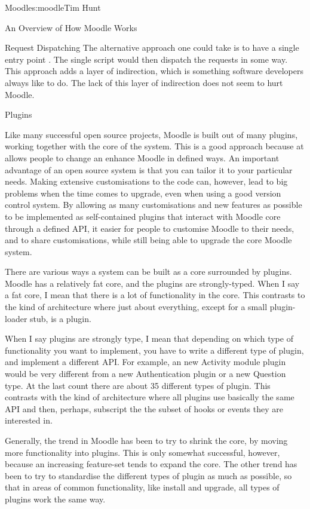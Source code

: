 \begin{aosachapter}{Moodle}{s:moodle}{Tim Hunt}
\begin{aosasect1}{An Overview of How Moodle Works}
\begin{aosasect2}{Request Dispatching}
The alternative approach one could take is to have a single entry
point . The single script  would then dispatch
the requests in some way. This approach adds a layer of indirection,
which is something software developers always like to do. The lack of
this layer of indirection does not seem to hurt Moodle.

\end{aosasect2}

\begin{aosasect2}{Plugins}

Like many successful open source projects, Moodle is built out of many
plugins, working together with the core of the system. This is a good
approach because at allows people to change an enhance Moodle in
defined ways. An important advantage of an open source system is that
you can tailor it to your particular needs. Making extensive
customisations to the code can, however, lead to big problems when the
time comes to upgrade, even when using a good version control
system. By allowing as many customisations and new features as
possible to be implemented as self-contained plugins that interact
with Moodle core through a defined API, it easier for people to
customise Moodle to their needs, and to share customisations, while
still being able to upgrade the core Moodle system.

There are various ways a system can be built as a core surrounded by
plugins. Moodle has a relatively fat core, and the plugins are
strongly-typed. When I say a fat core, I mean that there is a lot of
functionality in the core. This contrasts to the kind of architecture
where just about everything, except for a small plugin-loader stub, is
a plugin.

When I say plugins are strongly type, I mean that depending on which
type of functionality you want to implement, you have to write a
different type of plugin, and implement a different API. For example,
an new Activity module plugin would be very different from a new
Authentication plugin or a new Question type. At the last count there
are about 35 different types of plugin. This contrasts with the kind
of architecture where all plugins use basically the same API and then,
perhaps, subscript the the subset of hooks or events they are
interested in.

Generally, the trend in Moodle has been to try to shrink the core, by
moving more functionality into plugins. This is only somewhat
successful, however, because an increasing feature-set tends to expand
the core. The other trend has been to try to standardise the different
types of plugin as much as possible, so that in areas of common
functionality, like install and upgrade, all types of plugins work the
same way.


\end{aosasect2}
\end{aosasect1}
\end{aosachapter}
